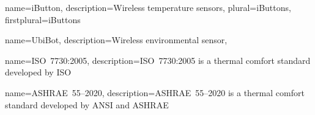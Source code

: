\usepackage[nonumberlist,nogroupskip]{glossaries}




{
name={iButton\textsuperscript{\tiny\textregistered}},
description={Wireless temperature sensors},
plural={iButtons\textsuperscript{\tiny\textregistered}},
firstplural={iButtons\textsuperscript{\tiny\textregistered}}
}

{
name={UbiBot\textsuperscript{\tiny\textregistered}},
description={Wireless environmental sensor},
}

{
name={ISO~7730:2005},
description={ISO~7730:2005 is a thermal comfort standard developed by ISO}
}

{
name={ASHRAE~55--2020},
description={ASHRAE~55--2020 is a thermal comfort standard developed by ANSI and ASHRAE}
}

\makenoidxglossaries